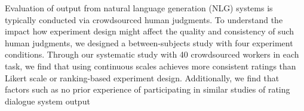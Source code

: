 Evaluation of output from natural language generation (NLG) systems is typically conducted via crowdsourced human judgments. To understand the impact how experiment design might affect the quality and consistency of such human judgments, we designed a between-subjects study with four experiment conditions. Through our systematic study with 40 crowdsourced workers in each task, we find that using continuous scales achieves more consistent ratings than Likert scale or ranking-based experiment design. Additionally, we find that factors such as no prior experience of participating in similar studies of rating dialogue system output
